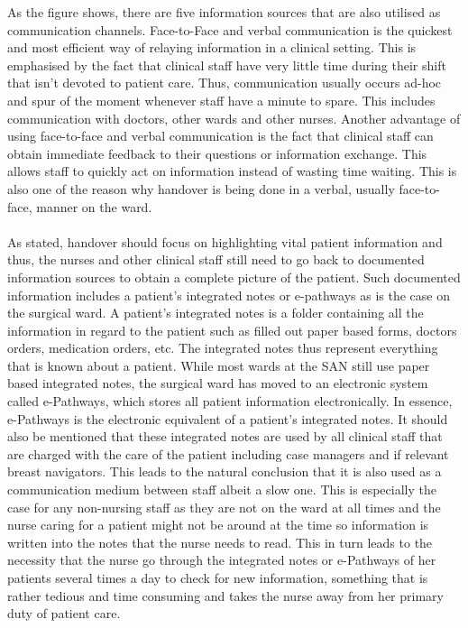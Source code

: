 \noindent As the figure shows, there are five information sources that are also utilised as communication channels. Face-to-Face and verbal communication is the quickest and most efficient way of relaying information in a clinical setting. This is emphasised by the fact that clinical staff have very little time during their shift that isn't devoted to patient care. Thus, communication usually occurs ad-hoc and spur of the moment whenever staff have a minute to spare. This includes communication with doctors, other wards and other nurses. Another advantage of using face-to-face and verbal communication is the fact that clinical staff can obtain immediate feedback to their questions or information exchange. This allows staff to quickly act on information instead of wasting time waiting. This is also one of the reason why handover is being done in a verbal, usually face-to-face, manner on the ward. 
\\ \\
As stated, handover should focus on highlighting vital patient information and thus, the nurses and other clinical staff still need to go back to documented information sources to obtain a complete picture of the patient. Such documented information includes a patient's integrated notes or e-pathways as is the case on the surgical ward. A patient's integrated notes is a folder containing all the information in regard to the patient such as filled out paper based forms, doctors orders, medication orders, etc. The integrated notes thus represent everything that is known about a patient. While most wards at the SAN still use paper based integrated notes, the surgical ward has moved to an electronic system called e-Pathways, which stores all patient information electronically. In essence, e-Pathways is the electronic equivalent of a patient's integrated notes. It should also be mentioned that these integrated notes are used by all clinical staff that are charged with the care of the patient including case managers and if relevant breast navigators. This leads to the natural conclusion that it is also used as a communication medium between staff albeit a slow one. This is especially the case for any non-nursing staff as they are not on the ward at all times and the nurse caring for a patient might not be around at the time so information is written into the notes that the nurse needs to read. This in turn leads to the necessity that the nurse go through the integrated notes or e-Pathways of her patients several times a day to check for new information, something that is rather tedious and time consuming and takes the nurse away from her primary duty of patient care.
